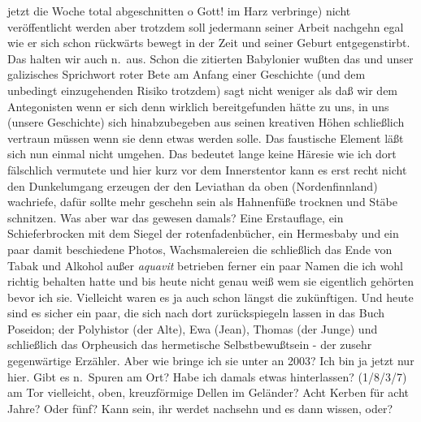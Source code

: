 \documentclass[
]{article}
\begin{document}
jetzt die Woche total abgeschnitten o Gott! im Harz verbringe) nicht
veröffentlicht werden aber trotzdem soll jedermann seiner Arbeit
nachgehn egal wie er sich schon rückwärts bewegt in der Zeit und seiner
Geburt entgegenstirbt. Das halten wir auch n.~aus. Schon die zitierten
Babylonier wußten das und unser galizisches Sprichwort roter Bete am
Anfang einer Geschichte (und dem unbedingt einzugehenden Risiko
trotzdem) sagt nicht weniger als daß wir dem Antegonisten wenn er sich
denn wirklich bereitgefunden hätte zu uns, in uns (unsere Geschichte)
sich hinabzubegeben aus seinen kreativen Höhen schließlich vertraun
müssen wenn sie denn etwas werden solle. Das faustische Element läßt
sich nun einmal nicht umgehen. Das bedeutet lange keine Häresie wie ich
dort fälschlich vermutete und hier kurz vor dem Innerstentor kann es
erst recht nicht den Dunkelumgang erzeugen der den Leviathan da oben
(Nordenfinnland) wachriefe, dafür sollte mehr geschehn sein als
Hahnenfüße trocknen und Stäbe schnitzen. Was aber war das gewesen
damals? Eine Erstauflage, ein Schieferbrocken mit dem Siegel der
rotenfadenbücher, ein Hermesbaby und ein paar damit beschiedene Photos,
Wachsmalereien die schließlich das Ende von Tabak und Alkohol außer
\emph{aquavit} betrieben ferner ein paar Namen die ich wohl richtig
behalten hatte und bis heute nicht genau weiß wem sie eigentlich
gehörten bevor ich sie. Vielleicht waren es ja auch schon längst die
zukünftigen. Und heute sind es sicher ein paar, die sich nach dort
zurückspiegeln lassen in das Buch Poseidon; der Polyhistor (der Alte),
Ewa (Jean), Thomas (der Junge) und schließlich das Orpheusich das
hermetische Selbstbewußtsein - der zusehr gegenwärtige Erzähler. Aber
wie bringe ich sie unter an 2003? Ich bin ja jetzt nur hier. Gibt es
n.~Spuren am Ort? Habe ich damals etwas hinterlassen? (1/8/3/7) am Tor
vielleicht, oben, kreuzförmige Dellen im Geländer? Acht Kerben für acht
Jahre? Oder fünf? Kann sein, ihr werdet nachsehn und es dann wissen,
oder?
\end{document}

